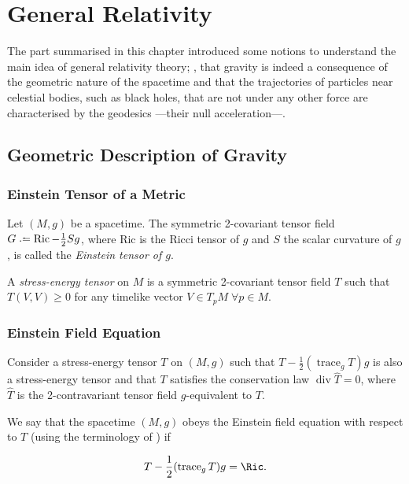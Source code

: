 \chapter{General Relativity}
\label{chapter:general-relativity}

The part summarised in this chapter introduced some notions to understand the main idea of general relativity theory; \ie, that gravity is indeed a consequence of the geometric nature of the spacetime and that the trajectories of particles near celestial bodies, such as black holes, that are not under any other force are characterised by the geodesics ---their null acceleration---.

\section{Geometric Description of Gravity}
\label{chapter:einstein}

\subsection{Einstein Tensor of a Metric}

Let $(M,g)$ be a spacetime. The symmetric 2-covariant tensor field $G \defeq \operatorname{Ric}-\frac{1}{2}Sg$, where Ric is the Ricci tensor of $g$ and $S$ the scalar curvature of $g$, is called the \emph{Einstein tensor of $g$}.

A \emph{stress-energy tensor} on $M$ is a symmetric 2-covariant tensor field $T$ such that $T(V,V) \geq 0$ for any timelike vector $V \in T_p M \; \forall p \in M$.

\subsection{Einstein Field Equation}

Consider a stress-energy tensor $T$ on $(M,g)$ such that $T - \frac{1}{2}(\operatorname{trace}_g T) g$ is also a stress-energy tensor and that $T$ satisfies the conservation law $\operatorname{div} \widehat{T} = 0$, where $\widehat{T}$ is the 2-contravariant tensor field $g$-equivalent to $T$.

We say that the spacetime $(M,g)$ obeys the Einstein field equation with respect to $T$ (using the terminology of \cite[Sec. 6.2]{sachswu77}) if

\begin{equation}
\label{eq:einstein3}
T - \frac{1}{2}(\operatorname{trace}_g T)g = \Ric.
\end{equation}

